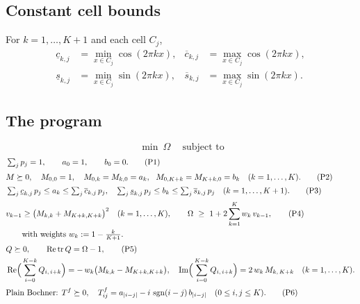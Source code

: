 \documentclass[11pt]{article}
\newcommand{\re}{\operatorname{Re}}
\newcommand{\im}{\operatorname{Im}}
\newcommand{\sgn}{\operatorname{sgn}}
\newcommand{\tr}{\operatorname{tr}}
\newcommand{\psdge}{\succeq 0}
\begin{document}
\subsection*{Constant cell bounds}
For $k=1,\dots,K+1$ and each cell $C_j$,
\[
\begin{aligned}
\underline{c}_{k,j}&=\min_{x\in C_j}\cos(2\pi k x), &
\overline{c}_{k,j}&=\max_{x\in C_j}\cos(2\pi k x),\\
\underline{s}_{k,j}&=\min_{x\in C_j}\sin(2\pi k x), &
\overline{s}_{k,j}&=\max_{x\in C_j}\sin(2\pi k x).
\end{aligned}
\]

\subsection*{The program}
\[
\boxed{\ \min\ \Omega\ }\quad\text{subject to}
\]
\begin{align}
&\textstyle\sum_{j} p_j = 1,\qquad a_0=1,\qquad b_0=0. \tag{P1}\\[2pt]
&M\psdge,\quad M_{0,0}=1,\quad
  M_{0,k}=M_{k,0}=a_k,\ \ M_{0,K+k}=M_{K+k,0}=b_k \quad(k=1,\dots,K). \tag{P2}\\[2pt]
&\textstyle\sum_j \underline{c}_{k,j}\,p_j\le a_k\le \sum_j \overline{c}_{k,j}\,p_j,
 \quad
 \sum_j \underline{s}_{k,j}\,p_j\le b_k\le \sum_j \overline{s}_{k,j}\,p_j
 \quad(k=1,\dots,K+1). \tag{P3}\\[2pt]
&v_{k-1}\ge \bigl(M_{k,k}+M_{K+k,K+k}\bigr)^2\quad(k=1,\dots,K),
 \qquad
 \Omega\ \ge\ 1+2\sum_{k=1}^{K} w_k\, v_{k-1}, \tag{P4}\\
&\qquad\text{with weights } w_k:=1-\tfrac{k}{K+1}. \notag\\[2pt]
&Q\psdge,\qquad \re\tr Q=\Omega-1, \tag{P5}\\
&\re\!\Big(\sum_{i=0}^{K-k} Q_{i,\,i+k}\Big)= -\,w_k\bigl(M_{k,k}-M_{K+k,K+k}\bigr),
 \quad
 \im\!\Big(\sum_{i=0}^{K-k} Q_{i,\,i+k}\Big)= 2\,w_k\, M_{k,\,K+k}
 \quad(k=1,\dots,K). \notag\\[2pt]
&\text{Plain Bochner: } T^{f}\psdge,\quad
 T^{f}_{ij}=a_{|i-j|}-i\,\sgn(i-j)\,b_{|i-j|}
 \quad(0\le i,j\le K). \tag{P6}
\end{align}
\end{document}
